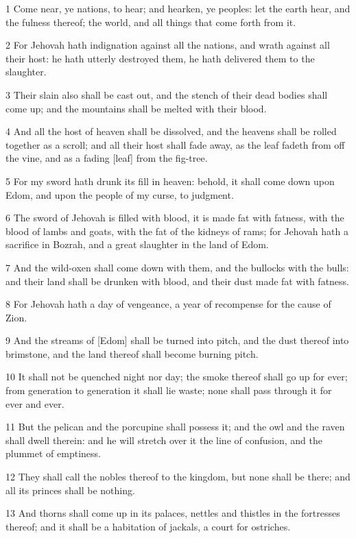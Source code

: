 \par 1 Come near, ye nations, to hear; and hearken, ye peoples: let the earth hear, and the fulness thereof; the world, and all things that come forth from it.
\par 2 For Jehovah hath indignation against all the nations, and wrath against all their host: he hath utterly destroyed them, he hath delivered them to the slaughter.
\par 3 Their slain also shall be cast out, and the stench of their dead bodies shall come up; and the mountains shall be melted with their blood.
\par 4 And all the host of heaven shall be dissolved, and the heavens shall be rolled together as a scroll; and all their host shall fade away, as the leaf fadeth from off the vine, and as a fading [leaf] from the fig-tree.
\par 5 For my sword hath drunk its fill in heaven: behold, it shall come down upon Edom, and upon the people of my curse, to judgment.
\par 6 The sword of Jehovah is filled with blood, it is made fat with fatness, with the blood of lambs and goats, with the fat of the kidneys of rams; for Jehovah hath a sacrifice in Bozrah, and a great slaughter in the land of Edom.
\par 7 And the wild-oxen shall come down with them, and the bullocks with the bulls: and their land shall be drunken with blood, and their dust made fat with fatness.
\par 8 For Jehovah hath a day of vengeance, a year of recompense for the cause of Zion.
\par 9 And the streams of [Edom] shall be turned into pitch, and the dust thereof into brimstone, and the land thereof shall become burning pitch.
\par 10 It shall not be quenched night nor day; the smoke thereof shall go up for ever; from generation to generation it shall lie waste; none shall pass through it for ever and ever.
\par 11 But the pelican and the porcupine shall possess it; and the owl and the raven shall dwell therein: and he will stretch over it the line of confusion, and the plummet of emptiness.
\par 12 They shall call the nobles thereof to the kingdom, but none shall be there; and all its princes shall be nothing.
\par 13 And thorns shall come up in its palaces, nettles and thistles in the fortresses thereof; and it shall be a habitation of jackals, a court for ostriches.
